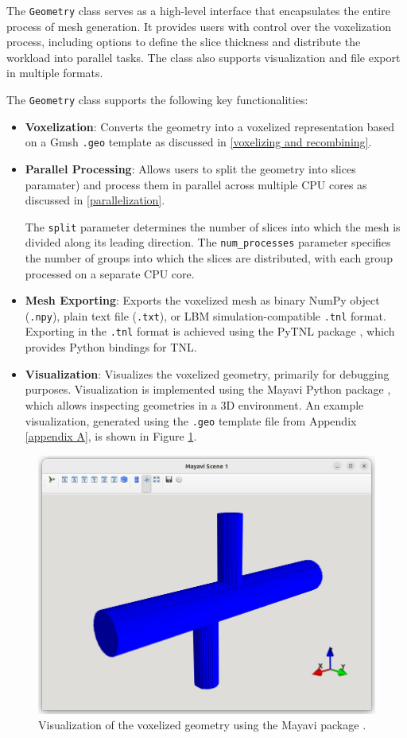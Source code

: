 The \texttt{Geometry} class serves as a high-level interface that encapsulates the entire process of mesh generation. It provides users with control over the voxelization process, including options to define the slice thickness and distribute the workload into parallel tasks. The class also supports visualization and file export in multiple formats.

The \texttt{Geometry} class supports the following key functionalities:
\begin{itemize}
	\item \textbf{Voxelization}: Converts the geometry into a voxelized representation based on a Gmsh \texttt{.geo} template as discussed in \ref{voxelizing and recombining}. 
	
	\item \textbf{Parallel Processing}: Allows users to split the geometry into slices paramater) and process them in parallel across multiple CPU cores as discussed in \ref{parallelization}.
	
	The \texttt{split} parameter determines the number of slices into which the mesh is divided along its leading direction. The \texttt{num\_processes} parameter specifies the number of groups into which the slices are distributed, with each group processed on a separate CPU core. 
	
	\item \textbf{Mesh Exporting}: Exports the voxelized mesh as binary NumPy object (\texttt{.npy}), plain text file (\texttt{.txt}), or LBM simulation-compatible \texttt{.tnl} format. Exporting in the \texttt{.tnl} format is achieved using the PyTNL package \cite{pytnl}, which provides Python bindings for TNL.
	
	\item \textbf{Visualization}: Visualizes the voxelized geometry, primarily for debugging purposes. Visualization is implemented using the Mayavi Python package \cite{mayavi}, which allows inspecting geometries in a 3D environment. An example visualization, generated using the \texttt{.geo} template file from Appendix \ref{appendix A}, is shown in Figure \ref{fig:visualization}.
\end{itemize}

\begin{figure}[H]
	\centering
	\includegraphics[width=.7\textwidth]{figures/mayavi.png}
	\caption{Visualization of the voxelized geometry using the Mayavi package \cite{mayavi}.}
	\label{fig:visualization}
\end{figure}


